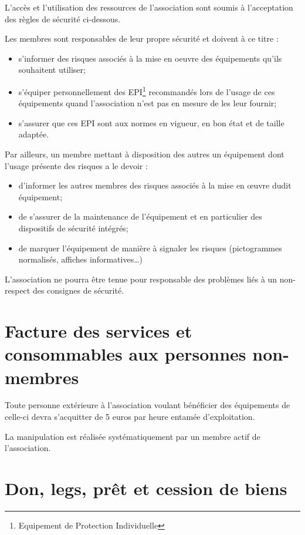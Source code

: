 \documentclass[a4paper, 11pt]{article}
\begin{document}
L'accès et l'utilisation des ressources de l'association sont soumis à l'acceptation des règles de sécurité ci-dessous.

Les membres sont responsables de leur propre sécurité et doivent à ce titre :

\begin{itemize}
    \item s'informer des risques associés à la mise en oeuvre des équipements qu'ils souhaitent utiliser;
    \item s'équiper personnellement des EPI\footnote{Equipement de Protection Individuelle} recommandés lors de l'usage
        de ces équipements quand l'association n'est pas en mesure de les leur fournir;
    \item s'assurer que ces EPI sont aux normes en vigueur, en bon état et de taille adaptée.
\end{itemize}

Par ailleurs, un membre mettant à disposition des autres un équipement dont l'usage présente des risques a le devoir :

\begin{itemize}
    \item d'informer les autres membres des risques associés à la mise en œuvre dudit équipement;
    \item de s'assurer de la maintenance de l'équipement et en particulier des dispositifs de sécurité intégrés;
    \item de marquer l'équipement de manière à signaler les risques (pictogrammes normalisés, affiches
        informatives\dots)
\end{itemize}

L'association ne pourra être tenue pour responsable des problèmes liés à un non-respect des consignes de sécurité.


\section{Facture des services et consommables aux personnes non-membres} %

Toute personne extérieure à l'association voulant bénéficier des
équipements de celle-ci devra s'acquitter de 5 euros par heure entamée
d'exploitation.


La manipulation est réalisée systématiquement par un membre actif de
l'association.


\section{Don, legs, prêt et cession de biens} %
\end{document}
